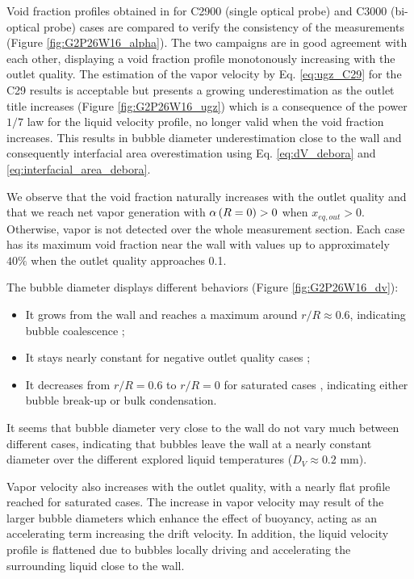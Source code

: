 Void fraction profiles obtained in for C2900 (single optical probe) and C3000 (bi-optical probe) cases are compared to verify the consistency of the measurements (Figure \ref{fig:G2P26W16_alpha}). The two campaigns are in good agreement with each other, displaying a void fraction profile monotonously increasing with the outlet quality. The estimation of the vapor velocity by Eq. \ref{eq:ugz_C29} for the C29 results is acceptable but presents a growing underestimation as the outlet title increases (Figure \ref{fig:G2P26W16_ugz}) which is a consequence of the power $1/7$ law for the liquid velocity profile, no longer valid when the void fraction increases. This results in bubble diameter underestimation close to the wall and consequently interfacial area overestimation using Eq. \ref{eq:dV_debora} and \ref{eq:interfacial_area_debora}.  

\npar

We observe that the void fraction naturally increases with the outlet quality and that we reach net vapor generation with $\alpha\left( R=0 \right) > 0$ when $x_{eq,out}>0$. Otherwise, vapor is not detected over the whole measurement section. Each case has its maximum void fraction near the wall with values up to approximately $40\%$ when the outlet quality approaches 0.1.

\npar

The bubble diameter displays different behaviors (Figure \ref{fig:G2P26W16_dv}): 

\begin{itemize}
\item It grows from the wall and reaches a maximum around $r/R \approx 0.6$, indicating bubble coalescence ;
\item It stays nearly constant for negative outlet quality cases ;
\item It decreases from $r/R = 0.6$ to $r/R = 0$ for saturated cases , indicating either bubble break-up or bulk condensation.
\end{itemize}

\begin{remark*}{}
It seems that bubble diameter very close to the wall do not vary much between different cases, indicating that bubbles leave the wall at a nearly constant diameter over the different explored liquid temperatures ($D_{V} \approx 0.2$ mm).
\end{remark*}

\npar

Vapor velocity also increases with the outlet quality, with a nearly flat profile reached for saturated cases. The increase in vapor velocity may result of the larger bubble diameters which enhance the effect of buoyancy, acting as an accelerating term increasing the drift velocity. In addition, the liquid velocity profile is flattened due to bubbles locally driving and accelerating the surrounding liquid close to the wall.

